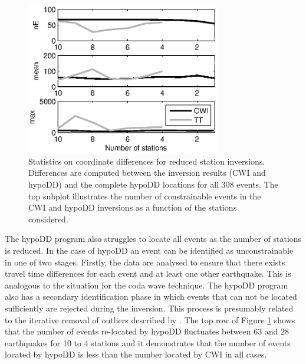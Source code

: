 \documentclass[extra]{gji}
\begin{document}

\begin{figure}
\noindent\includegraphics[width =
20pc]{diags/CalaverasLoc4_hypoDD_SVD.eps} \caption{Statistics on
coordinate differences for reduced station inversions. Differences
are computed between the inversion results (CWI and hypoDD) and the
complete hypoDD locations for all 308 events. The top subplot
illustrates the number of constrainable events in the CWI and hypoDD
inversions as a function of the stations considered.}
\label{fig-statremoval_summarystats}
\end{figure}


The hypoDD program also struggles to locate all events as the number
of stations is reduced. In the case of hypoDD an event can be
identified as unconstrainable in one of two stages. Firstly, the
data are analysed to ensure that there exists travel time
differences for each event and at least one other earthquake. This
is analogous to the situation for the coda wave technique. The
hypoDD program also has a secondary identification phase in which
events that can not be located sufficiently are rejected during the
inversion. This process is presumably related to the iterative
removal of outliers described by \citet{dr_Waldhauser00a}. The top
row of Figure \ref{fig-statremoval_summarystats} shows that the
number of events re-located by hypoDD fluctuates between 63 and 28
earthquakes for 10 to 4 stations and it demonstrates that the number
of events located by hypoDD is less than the number located by CWI
in all cases.
\end{document}
